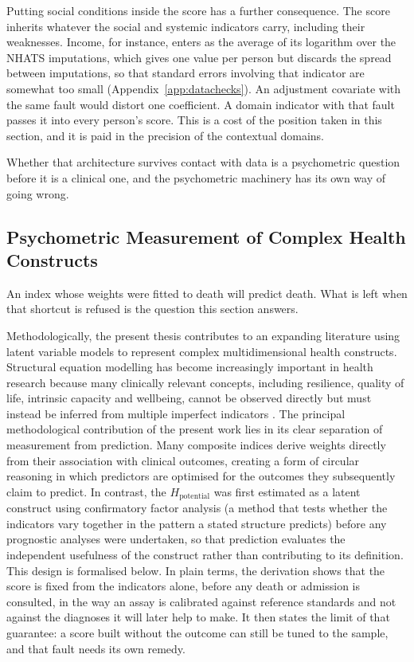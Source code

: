 Putting social conditions inside the score has a further consequence. The score
inherits whatever the social and systemic indicators carry, including their
weaknesses. Income, for instance, enters as the average of its logarithm over the
NHATS imputations, which gives one value per person but discards the spread between
imputations, so that standard errors involving that indicator are somewhat too small
(Appendix~\ref{app:datachecks}). An adjustment covariate with the same fault would
distort one coefficient. A domain indicator with that fault passes it into every
person's score. This is a cost of the position taken in this section, and it is
paid in the precision of the contextual domains.

Whether that architecture survives contact with data is a psychometric question
before it is a clinical one, and the psychometric machinery has its own way of
going wrong.

\subsection{Psychometric Measurement of Complex Health Constructs}
\label{sec:disc-psychometrics}

An index whose weights were fitted to death will predict death. What is left when
that shortcut is refused is the question this section answers.

Methodologically, the present thesis contributes to an expanding literature using latent variable models to represent complex multidimensional health constructs. Structural equation modelling has become increasingly important in health research because many clinically relevant concepts, including resilience, quality of life, intrinsic capacity \citep{cesari_2018} and wellbeing, cannot be observed directly but must instead be inferred from multiple imperfect indicators \citep{kline_2015,brown_2015}. The principal methodological contribution of the present work lies in its clear separation of measurement from prediction. Many composite indices derive weights directly from their association with clinical outcomes, creating a form of circular reasoning in which predictors are optimised for the outcomes they subsequently claim to predict. In contrast, the $H_{\text{potential}}$ was first estimated as a latent construct using confirmatory factor analysis (a method that tests whether the indicators vary together in the pattern a stated structure predicts) before any prognostic analyses were undertaken, so that prediction evaluates the independent usefulness of the construct rather than contributing to its definition. This design is formalised below. In plain terms, the derivation shows that the score is fixed from the indicators alone, before any death or admission is consulted, in the way an assay is calibrated against reference standards and not against the diagnoses it will later help to make. It then states the limit of that guarantee: a score built without the outcome can still be tuned to the sample, and that fault needs its own remedy.

